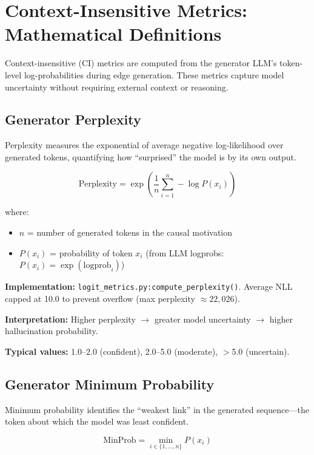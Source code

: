 \section{Context-Insensitive Metrics: Mathematical Definitions}
\label{sec:ci_metrics_definitions_standalone}

Context-insensitive (CI) metrics are computed from the generator LLM's token-level log-probabilities during edge generation. These metrics capture model uncertainty without requiring external context or reasoning.

\subsection{Generator Perplexity}

Perplexity measures the exponential of average negative log-likelihood over generated tokens, quantifying how ``surprised'' the model is by its own output.

\begin{equation}
\text{Perplexity} = \exp\left(\frac{1}{n}\sum_{i=1}^{n} -\log P(x_i)\right)
\label{eq:perplexity_def}
\end{equation}

where:
\begin{itemize}
    \item $n$ = number of generated tokens in the causal motivation
    \item $P(x_i)$ = probability of token $x_i$ (from LLM logprobs: $P(x_i) = \exp(\text{logprob}_i)$)
\end{itemize}

\textbf{Implementation:} \texttt{logit\_metrics.py:compute\_perplexity()}. Average NLL capped at 10.0 to prevent overflow (max perplexity $\approx 22{,}026$).

\textbf{Interpretation:} Higher perplexity $\rightarrow$ greater model uncertainty $\rightarrow$ higher hallucination probability.

\textbf{Typical values:} 1.0--2.0 (confident), 2.0--5.0 (moderate), $>$5.0 (uncertain).

\subsection{Generator Minimum Probability}

Minimum probability identifies the ``weakest link'' in the generated sequence---the token about which the model was least confident.

\begin{equation}
\text{MinProb} = \min_{i \in \{1,\ldots,n\}} P(x_i)
\label{eq:minprob_def}
\end{equation}

